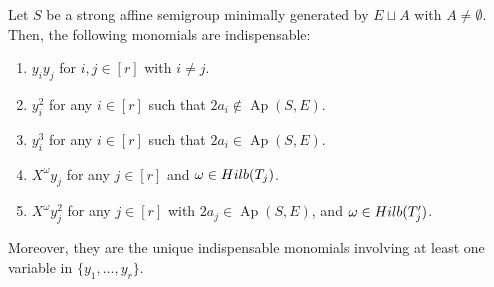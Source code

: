 \documentclass[10pt,a4paper]{amsart}
\def\Ap{\operatorname{Ap}}
\begin{document}
\begin{theorem}\label{TheoremYiYj}
Let $S$ be a strong affine semigroup minimally generated by $E\sqcup A$ with $A\neq \emptyset$. Then, the following monomials are indispensable:
\begin{enumerate}
\item $y_i y_j$ for $i,j\in [r]$ with $i\neq j$.
\item $y_i^2$ for any $i\in [r]$ such that $2a_i\notin \Ap(S,E)$.
\item $y_i^3$ for any $i\in [r]$ such that $2a_i\in \Ap(S,E)$.
\item $X^\omega y_j$  for any $j\in [r]$ and $\omega \in {\rm Hilb} (T_j)$.
\item $X^\omega y_j^2$  for any $j\in [r]$ with $2a_j\in\Ap(S,E)$, and $\omega \in {\rm Hilb} (T'_j)$.
\end{enumerate}
Moreover, they are the unique indispensable monomials involving at least one variable in $\{y_1,\ldots, y_r\}$.
\end{theorem}
\end{document}
